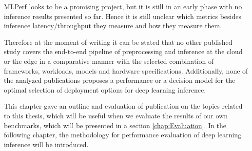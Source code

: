 MLPerf looks to be a promising project, but it is still in an early phase with no inference results presented so far. Hence it is still unclear which metrics besides inference latency/throughput they measure and how they measure them.

Therefore at the moment of writing it can be stated that no other published study covers the end-to-end pipeline of preprocessing and inference at the cloud or the edge in a comparative manner with the selected combination of frameworks, workloads, models and hardware specifications. 
Additionally, none of the analyzed publications proposes a performance or a decision model for the optimal selection of deployment options for deep learning inference.

\vspace{0.5cm}
This chapter gave an outline and evaluation of publication on the topics related to this thesis, which will be useful when we evaluate the results of our own benchmarks, which will be presented in a section \ref{chap:Evaluation}.
In the following chapter, the methodology for performance evaluation of deep learning inference will be introduced.

 \endinput 

